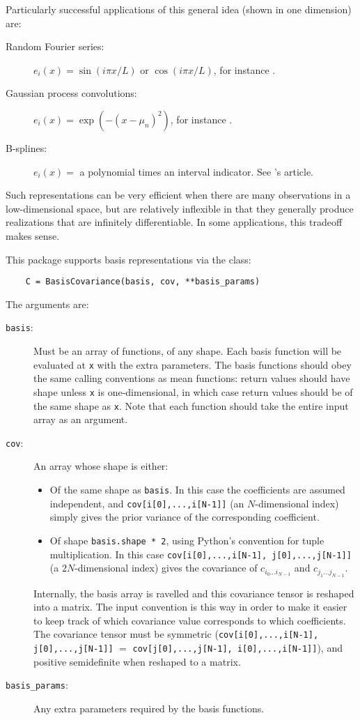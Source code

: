 Particularly successful applications of this general idea (shown in one dimension) are:
\begin{description}
    \item[Random Fourier series:] $e_i(x) = \sin(i\pi x/L)$ or $\cos(i\pi x/L)$, for instance \cite{spanos}.
    \item[Gaussian process convolutions:] $e_i(x) = \exp(-(x-\mu_n)^2)$, for instance \cite{convolution}.
    \item[B-splines:] $e_i(x) = $ a polynomial times an interval indicator. See 's article.
\end{description}
Such representations can be very efficient when there are many observations in a low-dimensional space, but are relatively inflexible in that they generally produce realizations that are infinitely differentiable. In some applications, this tradeoff makes sense.

This package supports basis representations via the  class:
\begin{verbatim}
    C = BasisCovariance(basis, cov, **basis_params)
\end{verbatim}
The arguments are:
\begin{description}
    \item[\texttt{basis}:] Must be an array of functions, of any shape. Each basis function will be evaluated at \texttt{x} with the extra parameters. The basis functions should obey the same calling conventions as mean functions: return values should have shape  unless \texttt{x} is one-dimensional, in which case return values should be of the same shape as \texttt{x}. Note that each function should take the entire input array as an argument.
    \item[\texttt{cov}:] An array whose shape is either:
        \begin{itemize}
            \item Of the same shape as \texttt{basis}. In this case the coefficients are assumed independent, and \texttt{cov[i[0],...,i[N-1]]} (an $N$-dimensional index) simply gives the prior variance of the corresponding coefficient.
            \item Of shape \texttt{basis.shape * 2}, using Python's convention for tuple multiplication. In this case \texttt{cov[i[0],...,i[N-1], j[0],...,j[N-1]]} (a $2N$-dimensional index) gives the covariance of $c_{i_0\ldots i_{N-1}}$ and $c_{j_1\ldots j_{N-1}}$.
        \end{itemize}
        Internally, the basis array is ravelled and this covariance tensor is reshaped into a matrix. The input convention is this way in order to make it easier to keep track of which covariance value corresponds to which coefficients. The covariance tensor must be symmetric (\texttt{cov[i[0],...,i[N-1], j[0],...,j[N-1]]} $=$ \texttt{cov[j[0],...,j[N-1], i[0],...,i[N-1]]}), and positive semidefinite when reshaped to a matrix.
    \item[\texttt{basis_params}:] Any extra parameters required by the basis functions.
\end{description}

